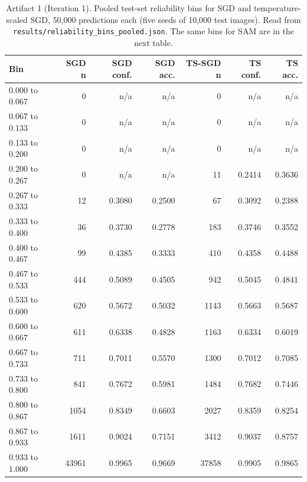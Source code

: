 \documentclass[11pt,letterpaper]{article}
\begin{document}
\begin{table}[!htbp]
\centering
\footnotesize
\caption{Artifact 1 (Iteration 1). Pooled test-set reliability bins for SGD and temperature-scaled SGD, 50,000 predictions each (five seeds of 10,000 test images). Read from \texttt{results/reliability\_bins\_pooled.json}. The same bins for SAM are in the next table.}
\label{tab:reliabA}
\begin{tabular}{lrrrrrr}
\toprule
Bin & SGD n & SGD conf. & SGD acc. & TS-SGD n & TS conf. & TS acc. \\
\midrule
0.000 to 0.067 & 0 & n/a & n/a & 0 & n/a & n/a \\
0.067 to 0.133 & 0 & n/a & n/a & 0 & n/a & n/a \\
0.133 to 0.200 & 0 & n/a & n/a & 0 & n/a & n/a \\
0.200 to 0.267 & 0 & n/a & n/a & 11 & 0.2414 & 0.3636 \\
0.267 to 0.333 & 12 & 0.3080 & 0.2500 & 67 & 0.3092 & 0.2388 \\
0.333 to 0.400 & 36 & 0.3730 & 0.2778 & 183 & 0.3746 & 0.3552 \\
0.400 to 0.467 & 99 & 0.4385 & 0.3333 & 410 & 0.4358 & 0.4488 \\
0.467 to 0.533 & 444 & 0.5089 & 0.4505 & 942 & 0.5045 & 0.4841 \\
0.533 to 0.600 & 620 & 0.5672 & 0.5032 & 1143 & 0.5663 & 0.5687 \\
0.600 to 0.667 & 611 & 0.6338 & 0.4828 & 1163 & 0.6334 & 0.6019 \\
0.667 to 0.733 & 711 & 0.7011 & 0.5570 & 1300 & 0.7012 & 0.7085 \\
0.733 to 0.800 & 841 & 0.7672 & 0.5981 & 1484 & 0.7682 & 0.7446 \\
0.800 to 0.867 & 1054 & 0.8349 & 0.6603 & 2027 & 0.8359 & 0.8254 \\
0.867 to 0.933 & 1611 & 0.9024 & 0.7151 & 3412 & 0.9037 & 0.8757 \\
0.933 to 1.000 & 43961 & 0.9965 & 0.9669 & 37858 & 0.9905 & 0.9865 \\
\bottomrule
\end{tabular}
\end{table}
\end{document}
